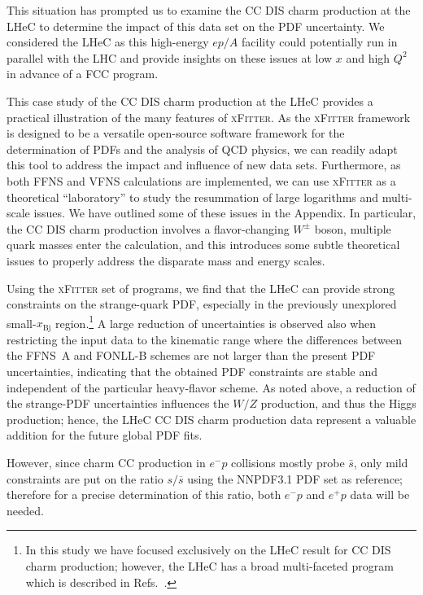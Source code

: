 \documentclass[pdftex,twocolumn,epjc3]{svjour3}          %
\newcommand{\xfitter} {\textsc{xFitter}\xspace}
\newcommand{\xbj}{\ensuremath{x_{\text{Bj}}}\xspace}
\newcommand{\fonll} {{FONLL-B}\xspace}
\newcommand{\ffns} {{FFNS~A}\xspace}
\newcommand\new[1]{{\color{blue} #1}}
\renewcommand\new[1]{{ #1}}
\begin{document}
This situation  has  prompted us to examine the CC DIS charm production at
the LHeC to determine the impact of this data set on the PDF
uncertainty.
%
We considered the LHeC  as this  high-energy $ep/A$
facility  could potentially run in parallel with the LHC and
provide insights on these issues at low $x$ and high $Q^2$ in advance of a FCC program.



%
This case study of the CC DIS charm production at the LHeC provides a
practical illustration of the many features of \xfitter.
%
As the \xfitter framework is designed to be a versatile open-source
software framework for the determination of PDFs and the analysis of
QCD physics, we can readily adapt this tool to address the impact and
influence of new data sets.
%
Furthermore, as both FFNS and VFNS calculations are implemented, we
can use \xfitter as a theoretical ``laboratory'' to study the
resummation of large logarithms and multi-scale issues.
%
We have outlined some of these issues in the Appendix.
%
In particular, the CC DIS charm production involves a flavor-changing
$W^\pm$ boson, multiple quark masses enter the calculation, and this
introduces some subtle theoretical issues to properly address the
disparate mass and energy scales.





%
Using the \xfitter set of programs, 
we find that the LHeC can provide strong constraints on the
strange-quark PDF, especially in the previously unexplored small-\xbj
region.\footnote{In this study we have focused exclusively on the LHeC
  result for CC DIS charm production; however, the LHeC has a broad
  multi-faceted program which is described in
  Refs.~\cite{AbelleiraFernandez:2012ty,Klein:2018rhq}.}
%
\new{A large reduction of uncertainties is observed also when restricting 
the input data to the kinematic range where the differences between the \ffns and 
\fonll schemes are not larger than the present PDF uncertainties, indicating 
that the obtained  PDF constraints are stable and 
independent of the particular heavy-flavor scheme.}
As noted above, a reduction of the strange-PDF uncertainties
influences the $W/Z$ production, and thus the Higgs production; hence,
the LHeC CC DIS charm production data represent a valuable addition
for the future global PDF fits.


\new{However, since charm CC production in $e^{-}p$ 
collisions mostly probe $\bar{s}$, only mild constraints are put on
the ratio $s/\overline{s}$ 
using the NNPDF3.1 PDF set as reference; therefore for a precise 
determination of this ratio, both $e^{-}p$ and $e^{+}p$ data will be needed.}
\end{document}
